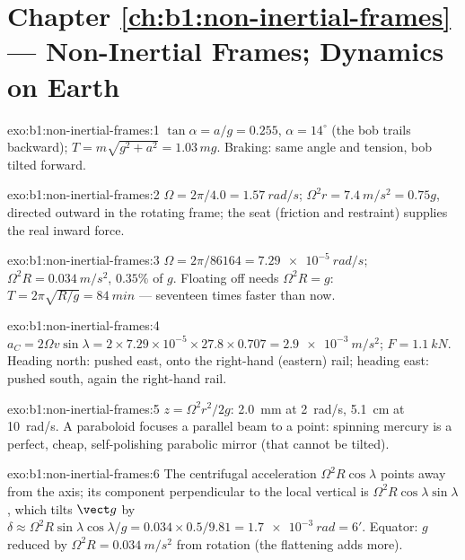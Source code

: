 \section*{Chapter \ref{ch:b1:non-inertial-frames} --- Non-Inertial Frames; Dynamics on Earth}

\begin{solution}{exo:b1:non-inertial-frames:1}
$\tan\alpha = a/g = 0.255$, $\alpha = 14^\circ$ (the bob trails backward);
$T = m\sqrt{g^2 + a^2} = 1.03\,mg$. Braking: same angle and tension, bob
tilted forward.
\end{solution}

\begin{solution}{exo:b1:non-inertial-frames:2}
$\Omega = 2\pi/4.0 = \qty{1.57}{rad/s}$; $\Omega^2r = \qty{7.4}{m/s^2} = 0.75g$,
directed outward in the rotating frame; the seat (friction and
restraint) supplies the real inward force.
\end{solution}

\begin{solution}{exo:b1:non-inertial-frames:3}
$\Omega = 2\pi/86164 = \qty{7.29e-5}{rad/s}$; $\Omega^2R = \qty{0.034}{m/s^2}$,
$0.35\%$ of $g$. Floating off needs $\Omega^2R = g$: $T = 2\pi\sqrt{R/g} =
\qty{84}{min}$ --- seventeen times faster than now.
\end{solution}

\begin{solution}{exo:b1:non-inertial-frames:4}
$a_C = 2\Omega v\sin\lambda = 2 \times 7.29\times10^{-5} \times 27.8 \times 0.707
= \qty{2.9e-3}{m/s^2}$; $F = \qty{1.1}{kN}$. Heading north: pushed east,
onto the right-hand (eastern) rail; heading east: pushed south, again
the right-hand rail.
\end{solution}

\begin{solution}{exo:b1:non-inertial-frames:5}
$z = \Omega^2r^2/2g$: \qty{2.0}{mm} at \qty{2}{rad/s}, \qty{5.1}{cm} at
\qty{10}{rad/s}. A paraboloid focuses a parallel beam to a point:
spinning mercury is a perfect, cheap, self-polishing parabolic mirror
(that cannot be tilted).
\end{solution}

\begin{solution}{exo:b1:non-inertial-frames:6}
The centrifugal acceleration $\Omega^2R\cos\lambda$ points away from the
axis; its component perpendicular to the local vertical is $\Omega^2R\cos\lambda
\sin\lambda$, which tilts $\vect g$ by $\delta \approx \Omega^2R\sin\lambda\cos\lambda/g
= 0.034 \times 0.5/9.81 = \qty{1.7e-3}{rad} = 6'$. Equator: $g$ reduced by
$\Omega^2R = \qty{0.034}{m/s^2}$ from rotation (the flattening adds more).
\end{solution}

